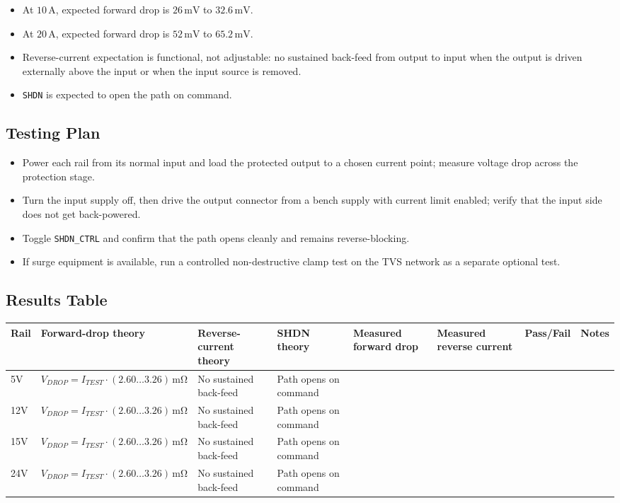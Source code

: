 \documentclass[11pt,a4paper]{article}
\begin{document}
\begin{itemize}
\item At $10\,\mathrm{A}$, expected forward drop is $26\,\mathrm{mV}$ to $32.6\,\mathrm{mV}$.
\item At $20\,\mathrm{A}$, expected forward drop is $52\,\mathrm{mV}$ to $65.2\,\mathrm{mV}$.
\item Reverse-current expectation is functional, not adjustable: no sustained back-feed from output to input when the output is driven externally above the input or when the input source is removed.
\item \texttt{SHDN} is expected to open the path on command.
\end{itemize}

\subsection{Testing Plan}

\begin{itemize}
\item Power each rail from its normal input and load the protected output to a chosen current point; measure voltage drop across the protection stage.
\item Turn the input supply off, then drive the output connector from a bench supply with current limit enabled; verify that the input side does not get back-powered.
\item Toggle \texttt{SHDN\_CTRL} and confirm that the path opens cleanly and remains reverse-blocking.
\item If surge equipment is available, run a controlled non-destructive clamp test on the TVS network as a separate optional test.
\end{itemize}

\subsection{Results Table}

\small
\begin{tabularx}{\textwidth}{p{1.2cm}p{3.0cm}p{2.8cm}p{2.4cm}p{2.2cm}p{2.2cm}p{1.8cm}Y}
\toprule
Rail & Forward-drop theory & Reverse-current theory & SHDN theory & Measured forward drop & Measured reverse current & Pass/Fail & Notes \\
\midrule
5V  & $V_{DROP} = I_{TEST} \cdot (2.60\ldots3.26)\,\mathrm{m\Omega}$ & No sustained back-feed & Path opens on command & & & & \\
12V & $V_{DROP} = I_{TEST} \cdot (2.60\ldots3.26)\,\mathrm{m\Omega}$ & No sustained back-feed & Path opens on command & & & & \\
15V & $V_{DROP} = I_{TEST} \cdot (2.60\ldots3.26)\,\mathrm{m\Omega}$ & No sustained back-feed & Path opens on command & & & & \\
24V & $V_{DROP} = I_{TEST} \cdot (2.60\ldots3.26)\,\mathrm{m\Omega}$ & No sustained back-feed & Path opens on command & & & & \\
\bottomrule
\end{tabularx}
\normalsize
\end{document}
